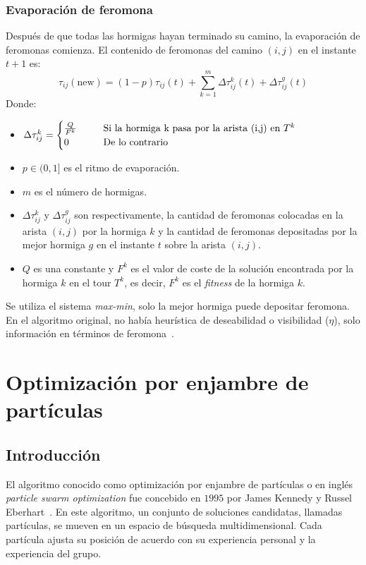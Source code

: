 \subsubsection{Evaporación de feromona}
Después de que todas las hormigas hayan terminado su camino, la evaporación de feromonas comienza. El contenido de feromonas del camino $(i,j)$ en el instante $t+1$ es:
\begin{equation}
    \tau_{ij}(\text{new})=(1-p)\tau_{ij}(t)+\sum_{k=1}^m\Delta\tau_{ij}^k(t)+\Delta\tau_{ij}^g(t)
\end{equation}
Donde:
\begin{itemize}
    \item $\Delta\tau_{ij}^k=\begin{cases}\frac{Q}{F^k}&\hspace{6mm}\text{Si la hormiga k pasa por la arista (i,j) en }T^k\\0 &\hspace{6mm}\text{De lo contrario}\end{cases}$
    \item $p\in (0,1]$ es el ritmo de evaporación.
    \item $m$ es el número de hormigas.
    \item $\Delta\tau_{ij}^k$ y $\Delta\tau_{ij}^g$ son respectivamente, la cantidad de feromonas colocadas en la arista $(i,j)$ por la hormiga $k$ y la cantidad de feromonas depositadas por la mejor hormiga $g$ en el instante $t$ sobre la arista $(i,j)$.
    \item $Q$ es una constante y $F^k$ es el valor de coste de la solución encontrada por la hormiga $k$ en el tour $T^k$, es decir, $F^k$ es el \textit{fitness} de la hormiga $k$.
\end{itemize}
Se utiliza el sistema \textit{max-min}, solo la mejor hormiga puede depositar feromona.\\[6pt]
En el algoritmo original, no había heurística de deseabilidad o visibilidad ($\eta$), solo información en términos de feromona~\cite{dorigo_ant_1999}.

\section{Optimización por enjambre de partículas}
\subsection{Introducción}
El algoritmo conocido como optimización por enjambre de partículas o en inglés \textit{particle swarm optimization} fue concebido en $1995$ por James Kennedy y Russel Eberhart~\cite{kennedy_particle_1995}. En este algoritmo, un conjunto de soluciones candidatas, llamadas partículas, se mueven en un espacio de búsqueda multidimensional. Cada partícula ajusta su posición de acuerdo con su experiencia personal y la experiencia del grupo.

